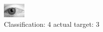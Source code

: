 \begin{figure}[h!]
\begin{center}
\includegraphics[width=0.60\columnwidth]{figures/ID2838_class_4_target_3.png}
\end{center}
\caption{ Classification: 4 actual target: 3}
\label{fig:ID2838_class_4_target_3}
\end{figure}
